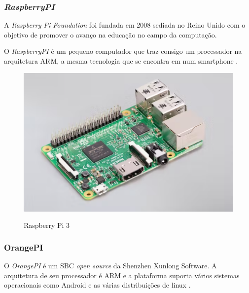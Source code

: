 \subsubsection{\textit{RaspberryPI}}

A \textit{Raspberry Pi Foundation} foi fundada em 2008 sediada no Reino Unido com o objetivo de promover o avanço na educação no campo da computação. \textit{\cite{rasp}}

O \textit{RaspberryPI} é um pequeno computador que traz consigo um processador na arquitetura ARM, a mesma tecnologia que se encontra em num smartphone \cite{rasp}.\newline

\begin{figure}[!htbp]
  \caption{Raspberry Pi 3}
  \includegraphics[scale=0.4]{images/rasp.png}
  \label{figura:rasp}
\end{figure}

\subsubsection{OrangePI}

O \textit{OrangePI} é um SBC \textit{open source} da Shenzhen Xunlong Software. A arquitetura de seu processador é ARM e a plataforma suporta vários sistemas operacionais como Android e as várias distribuições de linux \cite{orangepi}.\newline

